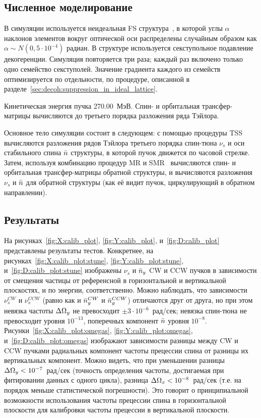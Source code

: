 \subsection{Численное моделирование}
В симуляции используется неидеальная FS структура~\cite{Senichev:Lattices}, в которой углы $\alpha$ 
наклонов элементов вокруг оптической оси распределены случайным образом 
как ${\alpha \sim N(0, 5\cdot10^{-4})}$ радиан. В структуре используется секступольное
подавление декогеренции. Симуляция повторяется три раза; каждый раз
включено только одно семейство секступолей. Значение градиента каждого
из семейств оптимизируется по отдельности, по процедуре, описанной
в разделе~\ref{sec:decoh:suppression_in_ideal_lattice}.

Кинетическая энергия пучка 270.00~МэВ.
Спин- и орбитальная трансфер-матрицы вычисляются до третьего порядка разложения ряда Тэйлора.

Основное тело симуляции состоит в следующем:
с помощью процедуры TSS~\cite[стр.~41]{COSYINF:Manual:BeamPhys} вычисляются разложения
рядов Тэйлора третьего порядка спин-тюна $\nu_s$ и оси стабильного спина $\bar n$ структуры, в которой пучок
движется по часовой стрелке. Затем, используя комбинацию процедур
MR и SMR~\cite[стр.~233]{Eremey:Thesis} вычисляются спин- и орбитальная трансфер-матрицы обратной структуры, и
вычисляются разложения $\nu_s$ и $\bar n$ для обратной структуры (как её видит пучок,
циркулирующий в обратном направлении).

\subsection{Результаты}

На рисунках~\ref{fig:X:calib_plot}, \ref{fig:Y:calib_plot}, и~\ref{fig:D:calib_plot} представлены
результаты тестов. Конкретнее, на рисунках~\ref{fig:X:calib_plot:stune},
\ref{fig:Y:calib_plot:stune}, и~\ref{fig:D:calib_plot:stune} изображены $\nu_s$ и $\bar n_y$
CW и CCW пучков в зависимости от смещения частицы от референсной в горизонтальной и вертикальной плоскостях,
и по энергии, соответственно. Можно наблюдать, что зависимости $\nu_s^{CW}$ и $\nu_s^{CCW}$ (равно как и
$\bar n_y^{CW}$ и $\bar n_y^{CCW}$) отличаются друг от друга, но при этом 
невязка частоты $\Delta\Omega_y$ не превосходит ${\pm3\cdot10^{-6}}$~рад/сек; 
невязка спин-тюна не превосходит уровня $10^{-13}$, поперечных компонент $\bar n$
уровня $10^{-8}$. Рисунки~\ref{fig:X:calib_plot:omegas}, \ref{fig:Y:calib_plot:omegas},
и~\ref{fig:D:calib_plot:omegas} изображают зависимости разницы между CW и CCW пучками
радиальных компонент частоты прецессии спина от разницы их вертикальных компонент. Можно видеть,
что при уменьшении разницы ${\Delta\Omega_y < 10^{-7}}$~рад/сек (точность определения частоты, достигаемая при
фитировании данных с одного цикла), разница ${\Delta \Omega_x < 10^{-8}}$~рад/сек (т.е.
на порядок меньше статистической погрешности). Это говорит о принципиальной возможности использования
частоты прецессии спина в горизонтальной плоскости для калибровки частоты прецессии в вертикальной плоскости.

